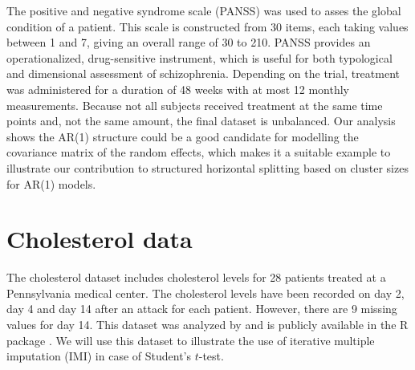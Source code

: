 \documentclass[11pt,a5paper,twoside]{book}
\begin{document}
The positive and negative syndrome scale (PANSS) was used to asses the global condition of a patient. This scale is constructed from 30 items, each taking values between 1 and 7, giving an overall range of 30 to 210. PANSS provides an operationalized, drug-sensitive instrument, which is useful for both typological and dimensional assessment of schizophrenia. Depending on the trial, treatment was administered for a duration of 48 weeks with at most 12 monthly measurements. Because not all subjects received treatment at the same time points and, not the same amount, the final dataset is unbalanced. Our analysis shows the AR(1) structure could be a good candidate for modelling the covariance matrix of the random effects, which makes it a suitable example to illustrate our contribution to structured horizontal splitting based on cluster sizes for AR(1) models.

\section{Cholesterol data}

The cholesterol dataset includes cholesterol levels for 28 patients treated at a Pennsylvania medical center. The cholesterol levels have been recorded on day 2, day 4 and day 14 after an attack for each patient. However, there are 9 missing values for day 14. This dataset was analyzed by \citet[Chapter 5]{schafer1997} and is publicly available in the \textsc{R} package {}. We will use this dataset to illustrate the use of iterative multiple imputation (IMI) in case of Student's $t$-test. 
\end{document}
